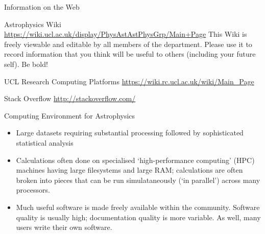 \documentclass{beamer}
\begin{document}
\begin{frame}{Information on the Web}
  \begin{block}{Astrophysics Wiki}
    \url{https://wiki.ucl.ac.uk/display/PhysAstAstPhysGrp/Main+Page}
    This Wiki is freely viewable and editable by all members of the department. Please use it to record information that you think will be useful to others (including your future self). Be bold!
  \end{block}

  \begin{block}{UCL Research Computing Platforms}
    \url{https://wiki.rc.ucl.ac.uk/wiki/Main_Page}
  \end{block}
  
  \begin{block}{Stack Overflow}
    \url{http://stackoverflow.com/}
  \end{block}
  
\end{frame}



\begin{frame}{Computing Environment for Astrophysics}
  \begin{itemize}
  \item Large datasets requiring substantial processing followed by sophisticated statistical analysis
  \item Calculations often done on specialised `high-performance computing' (HPC) machines having large filesystems and large RAM; calculations are often broken into pieces that can be run simulataneously (`in parallel') across many processors.
  \item Much useful software is made freely available within the community. Software quality is usually high; documentation quality is more variable. As well, many users write their own software.
  \end{itemize}
\end{frame}
\end{document}
